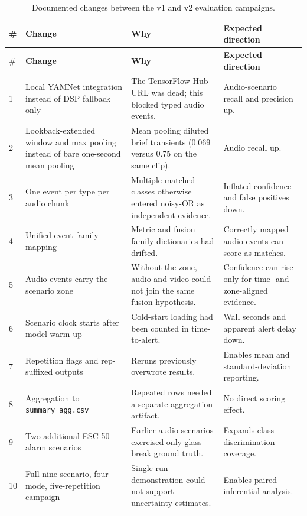 \small
\begin{longtable}{p{0.5cm}p{3.2cm}p{3.5cm}p{4.0cm}}
\caption{Documented changes between the v1 and v2 evaluation campaigns.}\label{tab:methodology-changes}\\
\toprule
\# & \textbf{Change} & \textbf{Why} & \textbf{Expected direction} \\
\midrule
\endfirsthead
\toprule
\# & \textbf{Change} & \textbf{Why} & \textbf{Expected direction} \\
\midrule
\endhead
1 & Local YAMNet integration instead of DSP fallback only & The TensorFlow Hub URL was dead; this blocked typed audio events. & Audio-scenario recall and precision up. \\
2 & Lookback-extended window and max pooling instead of bare one-second mean pooling & Mean pooling diluted brief transients (0.069 versus 0.75 on the same clip). & Audio recall up. \\
3 & One event per type per audio chunk & Multiple matched classes otherwise entered noisy-OR as independent evidence. & Inflated confidence and false positives down. \\
4 & Unified event-family mapping & Metric and fusion family dictionaries had drifted. & Correctly mapped audio events can score as matches. \\
5 & Audio events carry the scenario zone & Without the zone, audio and video could not join the same fusion hypothesis. & Confidence can rise only for time- and zone-aligned evidence. \\
6 & Scenario clock starts after model warm-up & Cold-start loading had been counted in time-to-alert. & Wall seconds and apparent alert delay down. \\
7 & Repetition flags and rep-suffixed outputs & Reruns previously overwrote results. & Enables mean and standard-deviation reporting. \\
8 & Aggregation to \texttt{summary\_agg.csv} & Repeated rows needed a separate aggregation artifact. & No direct scoring effect. \\
9 & Two additional ESC-50 alarm scenarios & Earlier audio scenarios exercised only glass-break ground truth. & Expands class-discrimination coverage. \\
10 & Full nine-scenario, four-mode, five-repetition campaign & Single-run demonstration could not support uncertainty estimates. & Enables paired inferential analysis. \\
\bottomrule
\end{longtable}
\normalsize

